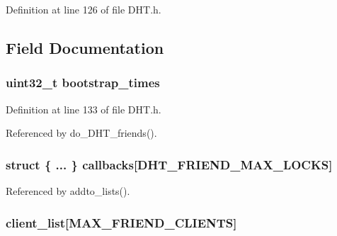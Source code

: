 Definition at line 126 of file D\+H\+T.\+h.



\subsection{Field Documentation}
\hypertarget{struct_d_h_t___friend_aae62716bf77c5ba5fca784702d47a5ff}{
\subsubsection[{bootstrap\+\_\+times}]{\setlength{\rightskip}{0pt plus 5cm}uint32\+\_\+t bootstrap\+\_\+times}}\label{struct_d_h_t___friend_aae62716bf77c5ba5fca784702d47a5ff}


Definition at line 133 of file D\+H\+T.\+h.



Referenced by do\+\_\+\+D\+H\+T\+\_\+friends().

\hypertarget{struct_d_h_t___friend_a1ef2d93ffeb76ceb01d28ecb1244547c}{
\subsubsection[{callbacks}]{\setlength{\rightskip}{0pt plus 5cm}struct \{ ... \}   callbacks\mbox{[}{\bf D\+H\+T\+\_\+\+F\+R\+I\+E\+N\+D\+\_\+\+M\+A\+X\+\_\+\+L\+O\+C\+K\+S}\mbox{]}}}\label{struct_d_h_t___friend_a1ef2d93ffeb76ceb01d28ecb1244547c}


Referenced by addto\+\_\+lists().

\hypertarget{struct_d_h_t___friend_a49ef2b640a834a77b6e123355a4fea47}{
\subsubsection[{client\+\_\+list}]{ client\+\_\+list\mbox{[}{\bf M\+A\+X\+\_\+\+F\+R\+I\+E\+N\+D\+\_\+\+C\+L\+I\+E\+N\+T\+S}\mbox{]}}}\label{struct_d_h_t___friend_a49ef2b640a834a77b6e123355a4fea47}


